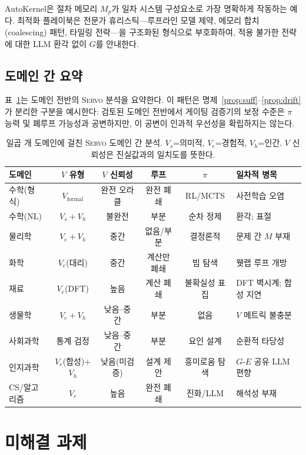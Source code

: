 \documentclass[11pt]{article}
\newcommand{\framework}{\textsc{Servo}}
\begin{document}
AutoKernel은 절차 메모리 $M_p$가 일차 시스템 구성요소로 가장 명확하게 작동하는 예다. 최적화 플레이북은 전문가 휴리스틱---루프라인 모델 제약, 메모리 합치(coalescing) 패턴, 타일링 전략---을 구조화된 형식으로 부호화하여, 적용 불가한 전략에 대한 LLM 환각 없이 $G$를 안내한다.

\subsection{도메인 간 요약}

표~\ref{tab:domain-comparison}는 도메인 전반의 \framework{} 분석을 요약한다. 이 패턴은 명제~\ref{prop:suff}--\ref{prop:drift}가 분리한 구분을 예시한다: 검토된 도메인 전반에서 게이팅 검증기의 보정 수준은 $\pi$ 능력 및 폐루프 가능성과 공변하지만, 이 공변이 인과적 우선성을 확립하지는 않는다.

\begin{table}[h]
\centering
\footnotesize
\setlength{\tabcolsep}{3pt}
\begin{tabular}{@{}lccccp{2.5cm}@{}}
\toprule
도메인 & $V$ 유형 & $V$ 신뢰성 & 루프 & $\pi$ & 일차적 병목 \\
\midrule
수학(형식) & $V_\text{formal}$ & 완전 오라클 & 완전 폐쇄 & RL/MCTS & 사전학습 오염 \\
수학(NL) & $V_s+V_h$ & 불완전 & 부분 & 순차 정제 & 환각; 표절 \\
물리학 & $V_e+V_h$ & 중간 & 없음/부분 & 결정론적 & 문제 간 $M$ 부재 \\
화학 & $V_e$(대리) & 중간 & 계산만 폐쇄 & 빔 탐색 & 웻랩 루프 개방 \\
재료 & $V_e$(DFT) & 높음 & 계산 폐쇄 & 불확실성 표집 & DFT 벽시계; 합성 지연 \\
생물학 & $V_e+V_h$ & 낮음--중간 & 부분 & 없음 & $V$ 메트릭 불충분 \\
사회과학 & 통계 검정 & 낮음--중간 & 부분 & 요인 설계 & 순환적 타당성 \\
인지과학 & $V_e$(합성)+$V_h$ & 낮음(미검증) & 설계 제안 & 흥미로움 탐색 & $G$-$E$ 공유 LLM 편향 \\
CS/알고리즘 & $V_e$ & 높음 & 완전 폐쇄 & 진화/LLM & 해석성 부재 \\
\bottomrule
\end{tabular}
\caption{일곱 개 도메인에 걸친 \framework{} 도메인 간 분석. $V_s$=의미적, $V_e$=경험적, $V_h$=인간. $V$ 신뢰성은 진실값과의 일치도를 뜻한다.}
\label{tab:domain-comparison}
\end{table}

\section{미해결 과제}
\label{sec:openproblems}
\end{document}
